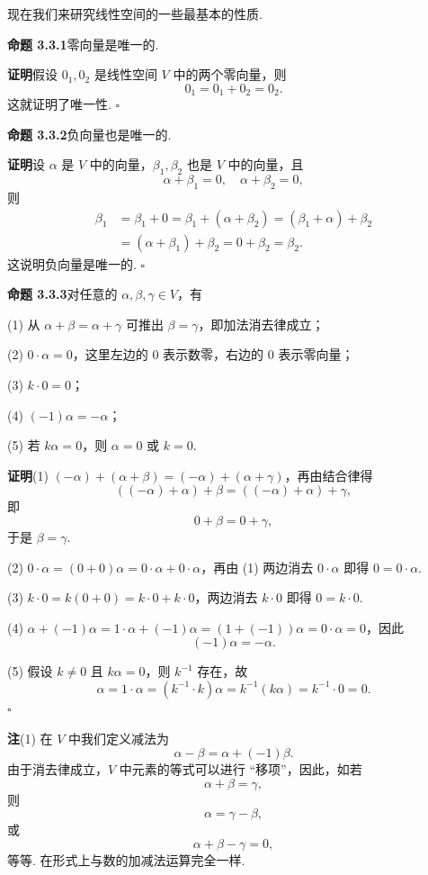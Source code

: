 \documentclass[UTF8,12pt,a4paper,fontset=fandol]{ctexart}
\begin{document}
现在我们来研究线性空间的一些最基本的性质.

\noindent\textbf{命题 3.3.1}\quad 零向量是唯一的.

\noindent\textbf{证明}\quad 假设 $0_1,0_2$ 是线性空间 $V$ 中的两个零向量，则
\[
0_1=0_1+0_2=0_2.
\]
这就证明了唯一性. $\square$

\noindent\textbf{命题 3.3.2}\quad 负向量也是唯一的.

\noindent\textbf{证明}\quad 设 $\alpha$ 是 $V$ 中的向量，$\beta_1,\beta_2$ 也是 $V$ 中的向量，且
\[
\alpha+\beta_1=0,\quad \alpha+\beta_2=0,
\]
则
\[
\begin{aligned}
\beta_1
&=\beta_1+0=\beta_1+(\alpha+\beta_2)=(\beta_1+\alpha)+\beta_2\\
&=(\alpha+\beta_1)+\beta_2=0+\beta_2=\beta_2.
\end{aligned}
\]
这说明负向量是唯一的. $\square$

\noindent\textbf{命题 3.3.3}\quad 对任意的 $\alpha,\beta,\gamma\in V$，有

(1) 从 $\alpha+\beta=\alpha+\gamma$ 可推出 $\beta=\gamma$，即加法消去律成立；

(2) $0\cdot\alpha=0$，这里左边的 $0$ 表示数零，右边的 $0$ 表示零向量；

(3) $k\cdot 0=0$；

(4) $(-1)\alpha=-\alpha$；

(5) 若 $k\alpha=0$，则 $\alpha=0$ 或 $k=0$.

\noindent\textbf{证明}\quad (1) $(-\alpha)+(\alpha+\beta)=(-\alpha)+(\alpha+\gamma)$，再由结合律得
\[
((-\alpha)+\alpha)+\beta= ((-\alpha)+\alpha)+\gamma,
\]
即
\[
0+\beta=0+\gamma,
\]
于是 $\beta=\gamma$.

(2) $0\cdot\alpha=(0+0)\alpha=0\cdot\alpha+0\cdot\alpha$，再由 (1) 两边消去 $0\cdot\alpha$ 即得 $0=0\cdot\alpha$.

(3) $k\cdot 0=k(0+0)=k\cdot 0+k\cdot 0$，两边消去 $k\cdot 0$ 即得 $0=k\cdot 0$.

(4) $\alpha+(-1)\alpha=1\cdot\alpha+(-1)\alpha=(1+(-1))\alpha=0\cdot\alpha=0$，因此
\[
(-1)\alpha=-\alpha.
\]

(5) 假设 $k\neq 0$ 且 $k\alpha=0$，则 $k^{-1}$ 存在，故
\[
\alpha=1\cdot\alpha=(k^{-1}\cdot k)\alpha=k^{-1}(k\alpha)=k^{-1}\cdot 0=0.
\]
$\square$

\noindent\textbf{注}\quad (1) 在 $V$ 中我们定义减法为
\[
\alpha-\beta=\alpha+(-1)\beta.
\]
由于消去律成立，$V$ 中元素的等式可以进行 ``移项''，因此，如若
\[
\alpha+\beta=\gamma,
\]
则
\[
\alpha=\gamma-\beta,
\]
或
\[
\alpha+\beta-\gamma=0,
\]
等等. 在形式上与数的加减法运算完全一样.
\end{document}
